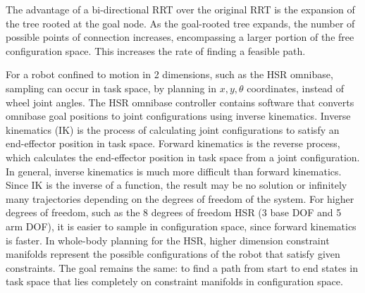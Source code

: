 \documentclass[11pt]{article}
\begin{document}
            \par The advantage of a bi-directional RRT over the original RRT is the expansion of the tree rooted at the goal node. As the goal-rooted tree expands, the number of possible points of connection increases, encompassing a larger portion of the free configuration space. This increases the rate of finding a feasible path.

            For a robot confined to motion in 2 dimensions, such as the HSR omnibase, sampling can occur in task space, by planning in $x,y, \theta$ coordinates, instead of wheel joint angles. The HSR omnibase controller contains software that converts omnibase goal positions to joint configurations using inverse kinematics. Inverse kinematics (IK) is the process of calculating joint configurations to satisfy an end-effector position in task space. Forward kinematics is the reverse process, which calculates the end-effector position in task space from a joint configuration. In general, inverse kinematics is much more difficult than forward kinematics. Since IK is the inverse of a function, the result may be no solution or infinitely many trajectories depending on the degrees of freedom of the system. 
            For higher degrees of freedom, such as the 8 degrees of freedom HSR (3 base DOF and 5 arm DOF), it is easier to sample in configuration space, since forward kinematics is faster. In whole-body planning for the HSR, higher dimension constraint manifolds represent the possible configurations of the robot that satisfy given constraints. The goal remains the same: to find a path from start to end states in task space that lies completely on constraint manifolds in configuration space.
\end{document}
